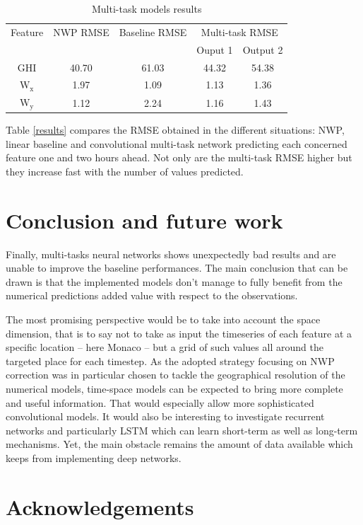 \documentclass{article}
\newcommand{\saut}{\vspace{10px}}
\begin{document}
\begin{table}[htb]\centering
\begin{tabular}{ccccc}
\toprule
      Feature&NWP RMSE&Baseline RMSE&\multicolumn{2}{c}{Multi-task RMSE}\\\cmidrule{4-5}
      &	 &	&	Ouput 1	&Output 2\\ \midrule
      GHI	&40.70&61.03&	44.32&54.38\\
      $\mathrm W_{\mathrm x}$	&1.97&1.09&1.13&1.36\\
      $\mathrm W_{\mathrm y}$	&1.12&2.24&1.16&1.43\\
      \bottomrule
\end{tabular}
\caption{Multi-task models results}
\label{tab:results}
\end{table}

Table \ref{results} compares the RMSE obtained in the different situations: NWP, linear baseline and convolutional
multi-task network predicting each concerned feature one and two hours ahead. Not only are the multi-task
RMSE higher but they increase fast with the number of values predicted.

\section*{Conclusion and future work}

Finally, multi-tasks neural networks shows unexpectedly bad results and are unable to improve the baseline
performances. The main conclusion that can be drawn is that the implemented models don't manage to fully
benefit from the numerical predictions added value with respect to the observations.

\saut

The most promising perspective would be to take into account the space dimension, that is to say not to take as input
the timeseries of each feature at a specific location -- here Monaco -- but a grid of such values all around the
targeted place for each timestep.
As the adopted strategy focusing on NWP correction was in particular chosen to tackle the geographical resolution
of the numerical models, time-space models can be expected to bring more complete and useful information.
That would especially allow more sophisticated convolutional models.
It would also be interesting to investigate recurrent networks and particularly
LSTM which can learn short-term as well as long-term mechanisms. Yet, the main obstacle remains the amount of data
available which keeps from implementing deep networks.

\section*{Acknowledgements}



\end{document}
